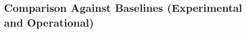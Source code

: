 \documentclass[a4paper,twoside]{sapthesis}
\begin{document}
\subsection{Comparison Against Baselines (Experimental and Operational)}
%
%
%
%
%
%
%
%
\end{document}
